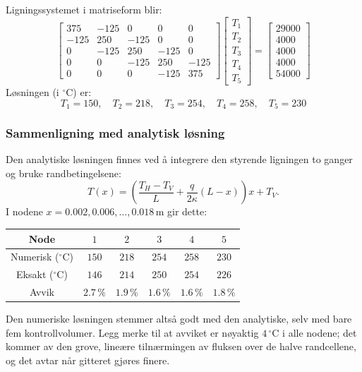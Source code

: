 Ligningssystemet i matriseform blir:
\[
\begin{bmatrix}
375 & -125 & 0 & 0&0 \\
-125 & 250 & -125 & 0 & 0 \\
0& -125& 250 & -125 & 0\\
0&0&-125& 250 &-125 \\
0&0&0&-125&375
\end{bmatrix}
\begin{bmatrix} T_1 \\ T_2 \\ T_3 \\ T_4 \\ T_5 \end{bmatrix} = \begin{bmatrix} 
29000\\ 4000 \\ 4000 \\ 4000 \\ 54000\end{bmatrix}
\]
Løsningen (i $^\circ$C) er:
\[
T_1 = 150, \quad T_2 = 218, \quad T_3 = 254, \quad T_4 = 258, \quad T_5 = 230
\]

\subsubsection*{Sammenligning med analytisk løsning}

Den analytiske løsningen finnes ved å integrere den styrende ligningen to ganger og bruke randbetingelsene:
\[
T(x) = \left(\frac{T_H - T_V}{L} + \frac{q}{2\kappa}(L-x)\right) x + T_V .
\]
I nodene $x = 0.002, 0.006, \ldots, 0.018\,\text{m}$ gir dette:
\begin{center}
\begin{tabular}{|c|c|c|c|c|c|}
\hline
Node & $1$ & $2$ & $3$ & $4$ & $5$ \\
\hline
Numerisk ($^\circ$C) & $150$ & $218$ & $254$ & $258$ & $230$ \\
Eksakt ($^\circ$C) & $146$ & $214$ & $250$ & $254$ & $226$ \\
Avvik & $2.7\,\%$ & $1.9\,\%$ & $1.6\,\%$ & $1.6\,\%$ & $1.8\,\%$ \\
\hline
\end{tabular}
\end{center}
Den numeriske løsningen stemmer altså godt med den analytiske, selv med bare fem kontrollvolumer. Legg merke til at avviket er nøyaktig $4\,^\circ$C i alle nodene; det kommer av den grove, lineære tilnærmingen av fluksen over de halve randcellene, og det avtar når gitteret gjøres finere.


